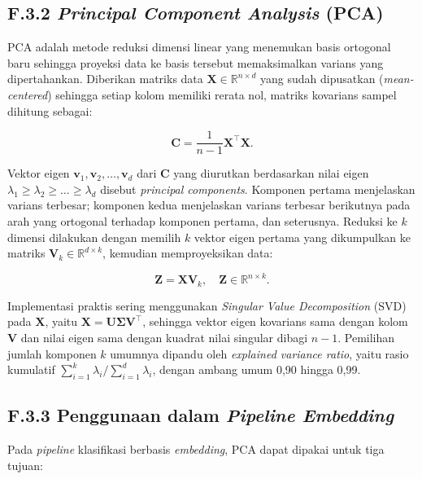 \subsection*{F.3.2 \textit{Principal Component Analysis} (PCA)}

PCA \citep{joliffePCA2002} adalah metode reduksi dimensi linear yang menemukan basis ortogonal baru sehingga proyeksi data ke basis tersebut memaksimalkan varians yang dipertahankan. Diberikan matriks data $\mathbf{X} \in \mathbb{R}^{n \times d}$ yang sudah dipusatkan (\textit{mean-centered}) sehingga setiap kolom memiliki rerata nol, matriks kovarians sampel dihitung sebagai:

\begin{equation}
    \mathbf{C} = \frac{1}{n-1} \mathbf{X}^\top \mathbf{X}.
    \label{eq:pca_cov}
\end{equation}

Vektor eigen $\mathbf{v}_1, \mathbf{v}_2, \dots, \mathbf{v}_d$ dari $\mathbf{C}$ yang diurutkan berdasarkan nilai eigen $\lambda_1 \geq \lambda_2 \geq \dots \geq \lambda_d$ disebut \textit{principal components}. Komponen pertama menjelaskan varians terbesar; komponen kedua menjelaskan varians terbesar berikutnya pada arah yang ortogonal terhadap komponen pertama, dan seterusnya. Reduksi ke $k$ dimensi dilakukan dengan memilih $k$ vektor eigen pertama yang dikumpulkan ke matriks $\mathbf{V}_k \in \mathbb{R}^{d \times k}$, kemudian memproyeksikan data:

\begin{equation}
    \mathbf{Z} = \mathbf{X} \mathbf{V}_k, \quad \mathbf{Z} \in \mathbb{R}^{n \times k}.
    \label{eq:pca_proj}
\end{equation}

Implementasi praktis sering menggunakan \textit{Singular Value Decomposition} (SVD) pada $\mathbf{X}$, yaitu $\mathbf{X} = \mathbf{U} \boldsymbol{\Sigma} \mathbf{V}^\top$, sehingga vektor eigen kovarians sama dengan kolom $\mathbf{V}$ dan nilai eigen sama dengan kuadrat nilai singular dibagi $n-1$. Pemilihan jumlah komponen $k$ umumnya dipandu oleh \textit{explained variance ratio}, yaitu rasio kumulatif $\sum_{i=1}^{k} \lambda_i / \sum_{i=1}^{d} \lambda_i$, dengan ambang umum 0,90 hingga 0,99.

\subsection*{F.3.3 Penggunaan dalam \textit{Pipeline Embedding}}

Pada \textit{pipeline} klasifikasi berbasis \textit{embedding}, PCA dapat dipakai untuk tiga tujuan:

